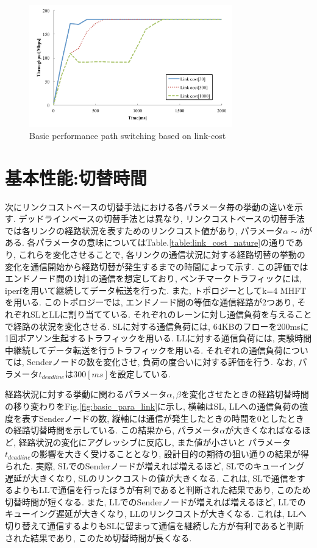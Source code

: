 \begin{figure}[t]
    \begin{center}
    \includegraphics[autoebb, width=250pt]{./img/basic_cost.pdf}
    \caption{Basic performance path switching based on
    link-cost}
    \label{fig:basic_cost}
    \end{center}
\end{figure}

\section{基本性能:切替時間}
次にリンクコストベースの切替手法における各パラメータ毎の挙動の違いを示す. 
デッドラインベースの切替手法とは異なり, リンクコストベースの切替手法では各リンクの経路状況を表すためのリンクコスト値があり, パラメータ$\alpha \sim
\delta$がある. 
各パラメータの意味についてはTable.\ref{table:link_cost_nature}の通りであり,
これらを変化させることで, 各リンクの通信状況に対する経路切替の挙動の変化を通信開始から経路切替が発生するまでの時間によって示す.
この評価ではエンドノード間の1対1の通信を想定しており, ベンチマークトラフィックには,
iperfを用いて継続してデータ転送を行った.  
また, トポロジーとしてk=4 MHFTを用いる. 
このトポロジーでは, エンドノード間の等価な通信経路が2つあり, それぞれSLとLLに割り当てている. 
それぞれのレーンに対し通信負荷を与えることで経路の状況を変化させる. 
SLに対する通信負荷には, 64KBのフローを200msに1回ポアソン生起するトラフィックを用いる. 
LLに対する通信負荷には, 実験時間中継続してデータ転送を行うトラフィックを用いる. 
それぞれの通信負荷については, Senderノードの数を変化させ, 負荷の度合いに対する評価を行う. 
なお, パラメータ$t_{deadline}$は$300[ms]$を設定している. 

経路状況に対する挙動に関わるパラメータ$\alpha,
\beta$を変化させたときの経路切替時間の移り変わりをFig.\ref{fig:basic_para_link}に示し, 横軸はSL,
LLへの通信負荷の強度を表すSenderノードの数, 縦軸には通信が発生したときの時間を0としたときの経路切替時間を示している. 
この結果から, パラメータ$\alpha$が大きくなればなるほど, 経路状況の変化にアグレッシブに反応し, また値が小さいと
パラメータ$t_{deadline}$の影響を大きく受けることとなり, 設計目的の期待の狙い通りの結果が得られた. 
実際, SLでのSenderノードが増えれば増えるほど, SLでのキューイング遅延が大きくなり, SLのリンクコストの値が大きくなる. 
これは, SLで通信をするよりもLLで通信を行ったほうが有利であると判断された結果であり, このため切替時間が短くなる. 
また, LLでのSenderノードが増えれば増えるほど, LLでのキューイング遅延が大きくなり, LLのリンクコストが大きくなる. 
これは, LLへ切り替えて通信するよりもSLに留まって通信を継続した方が有利であると判断された結果であり, このため切替時間が長くなる. 


